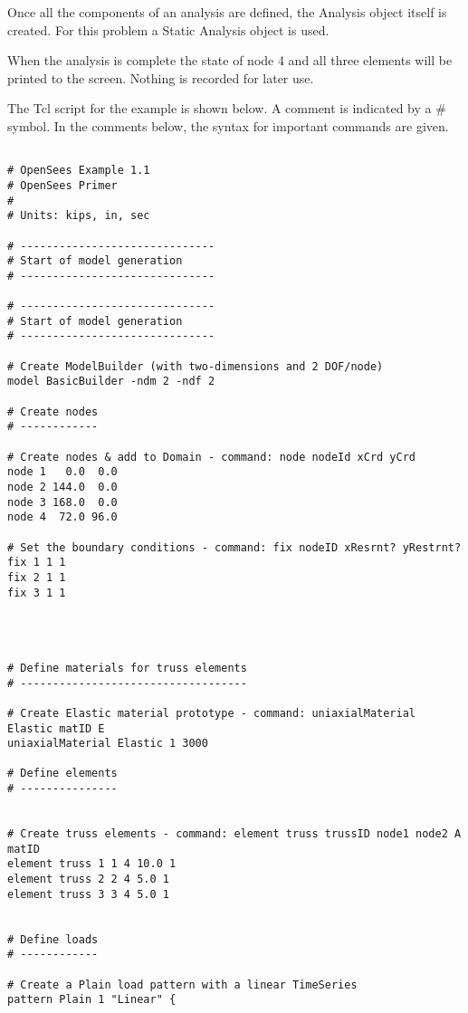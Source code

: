 \documentclass[12pt]{article}
\begin{document}
Once all the components of an analysis are defined, the Analysis
object itself is created.  For this problem a Static Analysis object
is used.


\vspace{0.2in} 

When the analysis is complete the state of node 4 and all three elements
will be printed to the screen. Nothing is recorded for later use.

\vspace{0.2in} 

The Tcl script for the example is shown below.  A comment is indicated
by a \# symbol. In the comments below, the syntax for important
commands are given.

{\sf\small
\begin{verbatim}

# OpenSees Example 1.1
# OpenSees Primer
#
# Units: kips, in, sec

# ------------------------------
# Start of model generation
# ------------------------------

# ------------------------------
# Start of model generation
# ------------------------------

# Create ModelBuilder (with two-dimensions and 2 DOF/node)
model BasicBuilder -ndm 2 -ndf 2

# Create nodes
# ------------

# Create nodes & add to Domain - command: node nodeId xCrd yCrd
node 1   0.0  0.0
node 2 144.0  0.0
node 3 168.0  0.0
node 4  72.0 96.0

# Set the boundary conditions - command: fix nodeID xResrnt? yRestrnt?
fix 1 1 1 
fix 2 1 1
fix 3 1 1




# Define materials for truss elements
# -----------------------------------

# Create Elastic material prototype - command: uniaxialMaterial Elastic matID E
uniaxialMaterial Elastic 1 3000

# Define elements
# ---------------


# Create truss elements - command: element truss trussID node1 node2 A matID
element truss 1 1 4 10.0 1
element truss 2 2 4 5.0 1
element truss 3 3 4 5.0 1


# Define loads
# ------------

# Create a Plain load pattern with a linear TimeSeries
pattern Plain 1 "Linear" {


\end{verbatim}}
\end{document}
